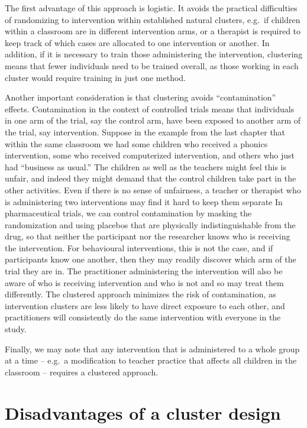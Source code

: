 \documentclass{krantz}
\begin{document}
The first advantage of this approach is logistic. It avoids the practical difficulties of randomizing to intervention within established natural clusters, e.g.~if children within a classroom are in different intervention arms, or a therapist is required to keep track of which cases are allocated to one intervention or another. In addition, if it is necessary to train those administering the intervention, clustering means that fewer individuals need to be trained overall, as those working in each cluster would require training in just one method.

Another important consideration is that clustering avoids ``contamination'' effects. Contamination in the context of controlled trials means that individuals in one arm of the trial, say the control arm, have been exposed to another arm of the trial, say intervention. Suppose in the example from the last chapter that within the same classroom we had some children who received a phonics intervention, some who received computerized intervention, and others who just had ``business as usual.'' The children as well as the teachers might feel this is unfair, and indeed they might demand that the control children take part in the other activities. Even if there is no sense of unfairness, a teacher or therapist who is administering two interventions may find it hard to keep them separate
In pharmaceutical trials, we can control contamination by masking the randomization and using placebos that are physically indistinguishable from the drug, so that neither the participant nor the researcher knows who is receiving the intervention. For behavioural interventions, this is not the case, and if participants know one another, then they may readily discover which arm of the trial they are in. The practitioner administering the intervention will also be aware of who is receiving intervention and who is not and so may treat them differently. The clustered approach minimizes the risk of contamination, as intervention clusters are less likely to have direct exposure to each other, and practitioners will consistently do the same intervention with everyone in the study.

Finally, we may note that any intervention that is administered to a whole group at a time -- e.g.~a modification to teacher practice that affects all children in the classroom -- requires a clustered approach.

\hypertarget{disadvantages-of-a-cluster-design}{%
\section{Disadvantages of a cluster design}\label{disadvantages-of-a-cluster-design}}
\end{document}
